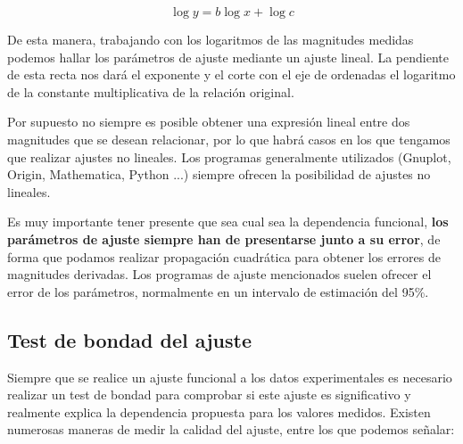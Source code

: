 \documentclass{book}
\begin{document}
\begin{equation}
  \log{y} = b \log{x} + \log{c}
\end{equation}

De esta manera, trabajando con los logaritmos de las magnitudes medidas podemos hallar los 
parámetros de ajuste mediante un ajuste lineal. La pendiente de esta recta nos dará el exponente
y el corte con el eje de ordenadas el logaritmo de la constante multiplicativa de la relación
original.

Por supuesto no siempre es posible obtener una expresión lineal entre dos magnitudes que se
desean relacionar, por lo que habrá casos en los que tengamos que realizar ajustes no lineales.
Los programas generalmente utilizados (Gnuplot, Origin, Mathematica, Python ...) siempre ofrecen
la posibilidad de ajustes no lineales.

Es muy importante tener presente que sea cual sea la dependencia funcional, \textbf{los parámetros de
ajuste siempre han de presentarse junto a su error}, de forma que podamos realizar propagación
cuadrática para obtener los errores de magnitudes derivadas. Los programas de ajuste mencionados
suelen ofrecer el error de los parámetros, normalmente en un intervalo de estimación del 95\%.


\subsection{Test de bondad del ajuste}

Siempre que se realice un ajuste funcional a los datos experimentales es necesario realizar un
test de bondad para comprobar si este ajuste es significativo y realmente explica la dependencia
propuesta para los valores medidos. Existen numerosas maneras de medir la calidad del ajuste, entre
los que podemos señalar:
\end{document}
